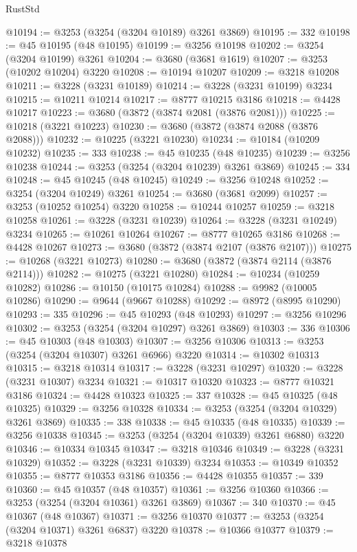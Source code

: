 \begin{lexlean}{RustStd}
\begin{coremodule}
@10194 := @3253 (@3254 (@3204 @10189) @3261 @3869)
@10195 := 332
@10198 := @45 @10195 (@48 @10195)
@10199 := @3256 @10198
@10202 := @3254 (@3204 @10199) @3261
@10204 := @3680 (@3681 @1619)
@10207 := @3253 (@10202 @10204) @3220
@10208 := @10194 @10207
@10209 := @3218 @10208
@10211 := @3228 (@3231 @10189)
@10214 := @3228 (@3231 @10199) @3234
@10215 := @10211 @10214
@10217 := @8777 @10215 @3186
@10218 := @4428 @10217
@10223 := @3680 (@3872 (@3874 @2081 (@3876 @2081)))
@10225 := @10218 (@3221 @10223)
@10230 := @3680 (@3872 (@3874 @2088 (@3876 @2088)))
@10232 := @10225 (@3221 @10230)
@10234 := @10184 (@10209 @10232)
@10235 := 333
@10238 := @45 @10235 (@48 @10235)
@10239 := @3256 @10238
@10244 := @3253 (@3254 (@3204 @10239) @3261 @3869)
@10245 := 334
@10248 := @45 @10245 (@48 @10245)
@10249 := @3256 @10248
@10252 := @3254 (@3204 @10249) @3261
@10254 := @3680 (@3681 @2099)
@10257 := @3253 (@10252 @10254) @3220
@10258 := @10244 @10257
@10259 := @3218 @10258
@10261 := @3228 (@3231 @10239)
@10264 := @3228 (@3231 @10249) @3234
@10265 := @10261 @10264
@10267 := @8777 @10265 @3186
@10268 := @4428 @10267
@10273 := @3680 (@3872 (@3874 @2107 (@3876 @2107)))
@10275 := @10268 (@3221 @10273)
@10280 := @3680 (@3872 (@3874 @2114 (@3876 @2114)))
@10282 := @10275 (@3221 @10280)
@10284 := @10234 (@10259 @10282)
@10286 := @10150 (@10175 @10284)
@10288 := @9982 (@10005 @10286)
@10290 := @9644 (@9667 @10288)
@10292 := @8972 (@8995 @10290)
@10293 := 335
@10296 := @45 @10293 (@48 @10293)
@10297 := @3256 @10296
@10302 := @3253 (@3254 (@3204 @10297) @3261 @3869)
@10303 := 336
@10306 := @45 @10303 (@48 @10303)
@10307 := @3256 @10306
@10313 := @3253 (@3254 (@3204 @10307) @3261 @6966) @3220
@10314 := @10302 @10313
@10315 := @3218 @10314
@10317 := @3228 (@3231 @10297)
@10320 := @3228 (@3231 @10307) @3234
@10321 := @10317 @10320
@10323 := @8777 @10321 @3186
@10324 := @4428 @10323
@10325 := 337
@10328 := @45 @10325 (@48 @10325)
@10329 := @3256 @10328
@10334 := @3253 (@3254 (@3204 @10329) @3261 @3869)
@10335 := 338
@10338 := @45 @10335 (@48 @10335)
@10339 := @3256 @10338
@10345 := @3253 (@3254 (@3204 @10339) @3261 @6880) @3220
@10346 := @10334 @10345
@10347 := @3218 @10346
@10349 := @3228 (@3231 @10329)
@10352 := @3228 (@3231 @10339) @3234
@10353 := @10349 @10352
@10355 := @8777 @10353 @3186
@10356 := @4428 @10355
@10357 := 339
@10360 := @45 @10357 (@48 @10357)
@10361 := @3256 @10360
@10366 := @3253 (@3254 (@3204 @10361) @3261 @3869)
@10367 := 340
@10370 := @45 @10367 (@48 @10367)
@10371 := @3256 @10370
@10377 := @3253 (@3254 (@3204 @10371) @3261 @6837) @3220
@10378 := @10366 @10377
@10379 := @3218 @10378

\end{coremodule}
\end{lexlean}

